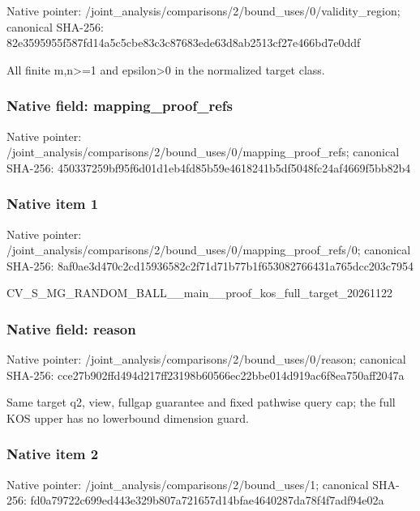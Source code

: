 \documentclass[10pt,a4paper]{article}
\begin{document}
Native pointer: /joint\_analysis/comparis\allowbreak{}ons/2/bound\_uses/0/valid\allowbreak{}ity\_region; canonical SHA-256: 82e3595955f587fd14a5c5cb\allowbreak{}e83c3c87683ede63d8ab2513\allowbreak{}cf27e466bd7e0ddf


All finite m,n>=1 and epsilon>0 in the normalized target class.


\subsubsection{Native field: mapping\_proof\_refs}


Native pointer: /joint\_analysis/comparis\allowbreak{}ons/2/bound\_uses/0/mappi\allowbreak{}ng\_proof\_refs; canonical SHA-256: 450337259bf95f6d01d1eb4f\allowbreak{}d85b59e4618241b5df5048fc\allowbreak{}24af4669f5bb82b4



\subsubsection{Native item 1}


Native pointer: /joint\_analysis/comparis\allowbreak{}ons/2/bound\_uses/0/mappi\allowbreak{}ng\_proof\_refs/0; canonical SHA-256: 8af0ae3d470c2cd15936582c\allowbreak{}2f71d71b77b1f65308276643\allowbreak{}1a765dcc203c7954


CV\_S\_MG\_RANDOM\_BALL\_\_mai\allowbreak{}n\_\_proof\_kos\_full\_target\allowbreak{}\_20261122


\subsubsection{Native field: reason}


Native pointer: /joint\_analysis/comparis\allowbreak{}ons/2/bound\_uses/0/reaso\allowbreak{}n; canonical SHA-256: cce27b902ffd494d217ff231\allowbreak{}98b60566ec22bbe014d919ac\allowbreak{}6f8ea750aff2047a


Same target q2, view, fullgap guarantee and fixed pathwise query cap; the full KOS upper has no lowerbound dimension guard.


\subsubsection{Native item 2}


Native pointer: /joint\_analysis/comparis\allowbreak{}ons/2/bound\_uses/1; canonical SHA-256: fd0a79722c699ed443e329b8\allowbreak{}07a721657d14bfae4640287d\allowbreak{}a78f4f7adf94e02a
\end{document}
